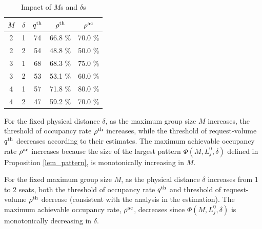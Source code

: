 \begin{table}[ht]
  \centering
  \caption{Impact of $M$s and $\delta$s}
  \begin{tabular}{ccccc}
  \hline
  \hline
   $M$  & $\delta$ & $q^{\textup{th}}$ & $\rho^{\textup{th}}$ & $\rho^{\textup{ac}}$ \\
  \hline
   2 & 1 & 74  & 66.8 \% & 70.0 \% \\
   2 & 2 & 54  & 48.8 \% & 50.0 \% \\ 
   3 & 1 & 68  & 68.3 \% & 75.0 \% \\
   3 & 2 & 53  & 53.1 \% & 60.0 \% \\
   4 & 1 & 57  & 71.8 \% & 80.0 \% \\
   4 & 2 & 47  & 59.2 \% & 70.0 \% \\
   \hline
   \hline
  \end{tabular}
\end{table}


For the fixed physical distance $\delta$, as the maximum group size $M$ increases, the threshold of occupancy rate $\rho^{\textup{th}}$ increases, while the threshold of request-volume $q^{\textup{th}}$ decreases according to their estimates. The maximum achievable occupancy rate $\rho^{\textup{ac}}$ increases because the size of the largest pattern $\Phi(M, L_j^{0}, \delta)$ defined in Proposition \ref{lem_pattern}, is monotonically increasing in $M$.

For the fixed maximum group size $M$, as the physical distance $\delta$ increases from 1 to 2 seats, both the threshold of occupancy rate $q^{\textup{th}}$ and threshold of request-volume $\rho^{\textup{th}}$ decrease (consistent with the analysis in the estimation). The maximum achievable occupancy rate, $\rho^{\textup{ac}}$, decreases since $\Phi(M, L_j^{0}, \delta)$ is monotonically decreasing in $\delta$.




